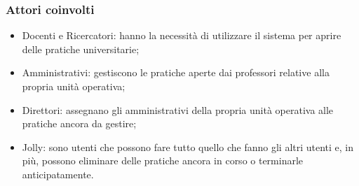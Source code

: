 \documentclass{article}
\begin{document}
\subsubsection{Attori coinvolti}
\begin{itemize}
    \item Docenti e Ricercatori: hanno la necessità di utilizzare il sistema per aprire delle pratiche universitarie;
    \item Amministrativi: gestiscono le pratiche aperte dai professori relative alla propria unità operativa;
    \item Direttori: assegnano gli amministrativi della propria unità operativa alle pratiche ancora da gestire;
    \item Jolly: sono utenti che possono fare tutto quello che fanno gli altri utenti e, in più, possono eliminare delle pratiche ancora in corso o terminarle anticipatamente.
\end{itemize}
\end{document}
